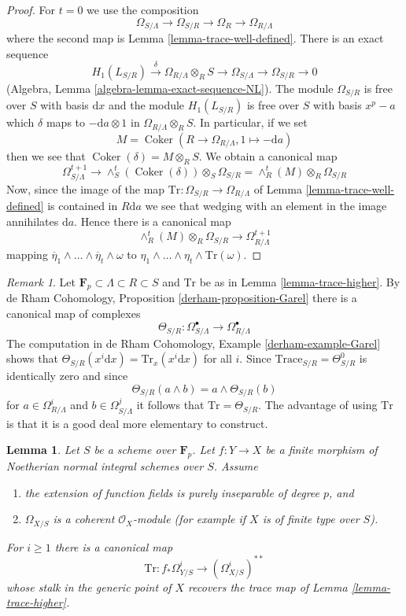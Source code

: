 \documentclass{stacks-project}
\theoremstyle{plain}
\newtheorem{lemma}[subsection]{Lemma}
\theoremstyle{definition}
\theoremstyle{remark}
\newtheorem{remark}[subsection]{Remark}
\numberwithin{equation}{subsection}
\def\Coker{\mathop{\mathrm{Coker}}}
\begin{document}
\begin{proof}
For $t = 0$ we use the composition
$$
\Omega_{S/\Lambda} \to \Omega_{S/R} \to \Omega_R \to \Omega_{R/\Lambda}
$$
where the second map is Lemma \ref{lemma-trace-well-defined}.
There is an exact sequence
$$
H_1(L_{S/R}) \xrightarrow{\delta} \Omega_{R/\Lambda} \otimes_R S \to
\Omega_{S/\Lambda} \to \Omega_{S/R} \to 0
$$
(Algebra, Lemma \ref{algebra-lemma-exact-sequence-NL}).
The module $\Omega_{S/R}$ is free over $S$ with basis $\text{d}x$
and the module $H_1(L_{S/R})$ is free over $S$ with basis $x^p - a$
which $\delta$ maps to $-\text{d}a \otimes 1$ in
$\Omega_{R/\Lambda} \otimes_R S$. In particular, if we set
$$
M = \Coker(R \to \Omega_{R/\Lambda}, 1 \mapsto -\text{d}a)
$$
then we see that $\Coker(\delta) = M \otimes_R S$. We obtain a
canonical map
$$
\Omega^{t + 1}_{S/\Lambda} \to
\wedge_S^t(\Coker(\delta)) \otimes_S \Omega_{S/R} =
\wedge^t_R(M) \otimes_R \Omega_{S/R}
$$
Now, since the image of the map
$\text{Tr} : \Omega_{S/R} \to \Omega_{R/\Lambda}$
of Lemma \ref{lemma-trace-well-defined} is contained in $R\text{d}a$ we
see that wedging with an element in the image annihilates $\text{d}a$.
Hence there is a canonical map
$$
\wedge^t_R(M) \otimes_R \Omega_{S/R} \to \Omega_{R/\Lambda}^{t + 1}
$$
mapping
$\overline{\eta}_1 \wedge \ldots \wedge \overline{\eta}_t \wedge \omega$
to $\eta_1 \wedge \ldots \wedge \eta_t \wedge \text{Tr}(\omega)$.
\end{proof}

\begin{remark}
\label{remark-compare-Garel}
Let $\mathbf{F}_p \subset \Lambda \subset R \subset S$ and $\text{Tr}$
be as in Lemma \ref{lemma-trace-higher}. By
de Rham Cohomology, Proposition \ref{derham-proposition-Garel}
there is a canonical map of complexes
$$
\Theta_{S/R} :
\Omega_{S/\Lambda}^\bullet
\longrightarrow
\Omega_{R/\Lambda}^\bullet
$$
The computation in de Rham Cohomology, Example \ref{derham-example-Garel}
shows that $\Theta_{S/R}(x^i \text{d}x) = \text{Tr}_x(x^i\text{d}x)$
for all $i$. Since $\text{Trace}_{S/R} = \Theta^0_{S/R}$
is identically zero and since
$$
\Theta_{S/R}(a \wedge b) = a \wedge \Theta_{S/R}(b)
$$
for $a \in \Omega^i_{R/\Lambda}$ and $b \in \Omega^j_{S/\Lambda}$
it follows that $\text{Tr} = \Theta_{S/R}$. The advantage of using $\text{Tr}$
is that it is a good deal more elementary to construct.
\end{remark}

\begin{lemma}
\label{lemma-trace-extends}
Let $S$ be a scheme over $\mathbf{F}_p$. Let $f : Y \to X$ be a finite morphism
of Noetherian normal integral schemes over $S$. Assume
\begin{enumerate}
\item the extension of function fields is purely inseparable of degree $p$, and
\item $\Omega_{X/S}$ is a coherent $\mathcal{O}_X$-module (for example
if $X$ is of finite type over $S$).
\end{enumerate}
For $i \geq 1$ there is a canonical map
$$
\text{Tr} : f_*\Omega^i_{Y/S} \longrightarrow (\Omega_{X/S}^i)^{**}
$$
whose stalk in the generic point of $X$ recovers the trace map of
Lemma \ref{lemma-trace-higher}.
\end{lemma}
\end{document}
